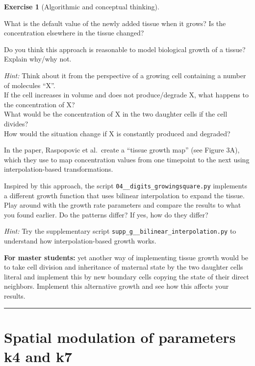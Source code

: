 \documentclass[
  letterpaper,
  DIV=11,
  numbers=noendperiod]{scrreprt}
\theoremstyle{definition}
\newtheorem{exercise}{Exercise}[chapter]
\theoremstyle{remark}
\begin{document}
\begin{exercise}[Algorithmic and conceptual
thinking]\protect\hypertarget{exr-tur}{}\label{exr-tur}

What is the default value of the newly added tissue when it grows? Is
the concentration elsewhere in the tissue changed?

Do you think this approach is reasonable to model biological growth of a
tissue? Explain why/why not.

\emph{Hint:} Think about it from the perspective of a growing cell
containing a number of molecules ``X''.\\
If the cell increases in volume and does not produce/degrade X, what
happens to the concentration of X?\\
What would be the concentration of X in the two daughter cells if the
cell divides?\\
How would the situation change if X is constantly produced and degraded?

In the paper, Raspopovic et al.~create a ``tissue growth map'' (see
Figure 3A), which they use to map concentration values from one
timepoint to the next using interpolation-based transformations.

Inspired by this approach, the script
\texttt{04\_\_digits\_growingsquare.py} implements a different growth
function that uses bilinear interpolation to expand the tissue. Play
around with the growth rate parameters and compare the results to what
you found earlier. Do the patterns differ? If yes, how do they differ?

\emph{Hint:} Try the supplementary script
\texttt{supp\_g\_\_bilinear\_interpolation.py} to understand how
interpolation-based growth works.

\textbf{For master students:} yet another way of implementing tissue
growth would be to take cell division and inheritance of maternal state
by the two daughter cells literal and implement this by new boundary
cells copying the state of their direct neighbors. Implement this
alternative growth and see how this affects your results.

\end{exercise}

\begin{center}\rule{0.5\linewidth}{0.5pt}\end{center}

\section{Spatial modulation of parameters k4 and
k7}\label{spatial-modulation-of-parameters-k4-and-k7}
\end{document}
